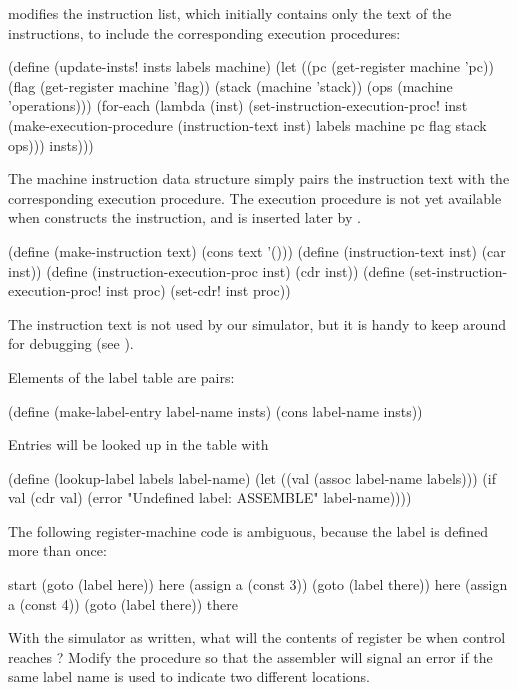  modifies the instruction list, which initially contains
only the text of the instructions, to include the corresponding execution
procedures:

\begin{codeBlock}
(define (update-insts! insts labels machine)
  (let ((pc (get-register machine 'pc))
        (flag (get-register machine 'flag))
        (stack (machine 'stack))
        (ops (machine 'operations)))
    (for-each
     (lambda (inst)
       (set-instruction-execution-proc!
        inst
        (make-execution-procedure
         (instruction-text inst)
         labels machine pc flag stack ops)))
     insts)))
\end{codeBlock}

\noindent
The machine instruction data structure simply pairs the instruction text with
the corresponding execution procedure.  The execution procedure is not yet
available when  constructs the instruction, and is
inserted later by .

\begin{codeBlock}
(define (make-instruction text) (cons text '()))
(define (instruction-text inst) (car inst))
(define (instruction-execution-proc inst) (cdr inst))
(define (set-instruction-execution-proc! inst proc)
  (set-cdr! inst proc))
\end{codeBlock}

\noindent
The instruction text is not used by our simulator, but it is handy to keep
around for debugging (see ).

Elements of the label table are pairs:

\begin{codeBlock}
(define (make-label-entry label-name insts)
  (cons label-name insts))
\end{codeBlock}

\noindent
Entries will be looked up in the table with

\begin{codeBlock}
(define (lookup-label labels label-name)
  (let ((val (assoc label-name labels)))
    (if val
        (cdr val)
        (error "Undefined label: ASSEMBLE"
               label-name))))
\end{codeBlock}

\begin{exerciseGroup}
\label{Exercise 5.8}
 The following register-machine code
is ambiguous, because the label  is defined more than once:

\begin{codeBlock}
start
  (goto (label here))
here
  (assign a (const 3))
  (goto (label there))
here
  (assign a (const 4))
  (goto (label there))
there
\end{codeBlock}

With the simulator as written, what will the contents of register  be
when control reaches ?  Modify the  procedure
so that the assembler will signal an error if the same label name is used to
indicate two different locations.
\end{exerciseGroup}

